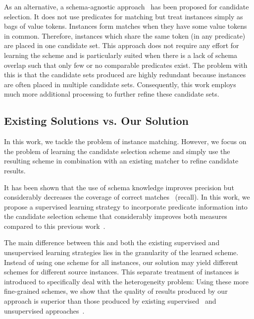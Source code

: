As an alternative, a schema-agnostic approach~\cite{} has been proposed for candidate selection. It does not use predicates for matching but treat instances simply as bags of value tokens. Instances form matches when they have some value tokens in common. Therefore, instances which share the same token (in any predicate) are placed in one candidate set. This approach does not require any effort for learning the scheme and is particularly suited when there is a lack of schema overlap such that only few or no comparable predicates exist. The problem with this is that the candidate sets produced are highly redundant because instances are often placed in multiple candidate sets. Consequently, this work employs much more additional processing to further refine these candidate sets. 


\subsection{Existing Solutions vs. Our Solution}
In this work, we tackle the problem of instance matching. However, we focus on the problem of learning the candidate selection scheme and simply use the resulting scheme in combination with an existing matcher to refine candidate results. 

It has been shown that the use of schema knowledge improves precision but considerably decreases the coverage of correct matches~\cite{} (recall). In this work, we propose a supervised learning strategy to incorporate predicate information into the candidate selection scheme that considerably improves both measures compared to this previous work~\cite{}. 

The main difference between this and both the existing supervised and unsupervised learning strategies lies in the granularity of the learned scheme. Instead of using one scheme for all instances, our solution may yield different schemes for different source instances. This separate treatment of instances is introduced to specifically deal with the heterogeneity problem:  Using these more fine-grained schemes, we show that the quality of results produced by our approach is superior than those produced by existing supervised~\cite{DBLP:conf/vldb/ChaudhuriCGK07} and unsupervised approaches~\cite{DBLP:conf/semweb/SongH11}. 

